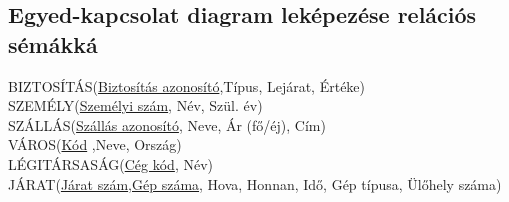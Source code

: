 \subsection{Egyed-kapcsolat diagram leképezése relációs sémákká}

    BIZTOSÍTÁS(\underline{Biztosítás azonosító},Típus, Lejárat, Értéke)\\
    SZEMÉLY(\underline{Személyi szám}, Név, Szül. év)\\
    SZÁLLÁS(\underline{Szállás azonosító}, Neve, Ár (fő/éj), Cím)\\
    VÁROS(\underline{Kód} ,Neve, Ország)\\
    LÉGITÁRSASÁG(\underline{Cég kód}, Név)\\
    JÁRAT(\underline{Járat szám},\underline{Gép száma}, Hova, Honnan, Idő, Gép típusa, Ülőhely száma)

